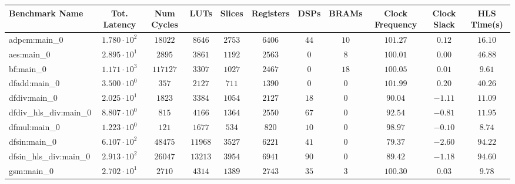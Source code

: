 \begin{tabular}{|l|c|c|c|c|c|c|c|c|c|c|}
\hline
Benchmark Name          & Tot. Latency           & Num Cycles & LUTs      & Slices    & Registers & DSPs    & BRAMs   & Clock Frequency & Clock Slack & HLS Time(s) \\
\hline
adpcm:main\_0           & $ 1.780 \cdot 10^{2} $ & $ 18022  $ & $ 8646  $ & $ 2753  $ & $ 6406  $ & $ 44  $ & $ 10  $ & $ 101.27      $ & $ 0.12    $ & $ 16.10   $ \\
aes:main\_0             & $ 2.895 \cdot 10^{1} $ & $ 2895   $ & $ 3861  $ & $ 1192  $ & $ 2563  $ & $ 0   $ & $ 8   $ & $ 100.01      $ & $ 0.00    $ & $ 46.88   $ \\
bf:main\_0              & $ 1.171 \cdot 10^{3} $ & $ 117127 $ & $ 3307  $ & $ 1027  $ & $ 2467  $ & $ 0   $ & $ 18  $ & $ 100.05      $ & $ 0.01    $ & $ 9.61    $ \\
dfadd:main\_0           & $ 3.500 \cdot 10^{0} $ & $ 357    $ & $ 2127  $ & $ 711   $ & $ 1390  $ & $ 0   $ & $ 0   $ & $ 101.99      $ & $ 0.20    $ & $ 40.26   $ \\
dfdiv:main\_0           & $ 2.025 \cdot 10^{1} $ & $ 1823   $ & $ 3384  $ & $ 1054  $ & $ 2127  $ & $ 18  $ & $ 0   $ & $ 90.04       $ & $ -1.11   $ & $ 11.09   $ \\
dfdiv\_hls\_div:main\_0 & $ 8.807 \cdot 10^{0} $ & $ 815    $ & $ 4166  $ & $ 1364  $ & $ 2550  $ & $ 67  $ & $ 0   $ & $ 92.54       $ & $ -0.81   $ & $ 11.95   $ \\
dfmul:main\_0           & $ 1.223 \cdot 10^{0} $ & $ 121    $ & $ 1677  $ & $ 534   $ & $ 820   $ & $ 10  $ & $ 0   $ & $ 98.97       $ & $ -0.10   $ & $ 8.74    $ \\
dfsin:main\_0           & $ 6.107 \cdot 10^{2} $ & $ 48475  $ & $ 11968 $ & $ 3527  $ & $ 6221  $ & $ 41  $ & $ 0   $ & $ 79.37       $ & $ -2.60   $ & $ 94.22   $ \\
dfsin\_hls\_div:main\_0 & $ 2.913 \cdot 10^{2} $ & $ 26047  $ & $ 13213 $ & $ 3954  $ & $ 6941  $ & $ 90  $ & $ 0   $ & $ 89.42       $ & $ -1.18   $ & $ 94.60   $ \\
gsm:main\_0             & $ 2.702 \cdot 10^{1} $ & $ 2710   $ & $ 4314  $ & $ 1389  $ & $ 2743  $ & $ 35  $ & $ 3   $ & $ 100.30      $ & $ 0.03    $ & $ 9.78    $ \\

\end{tabular}
